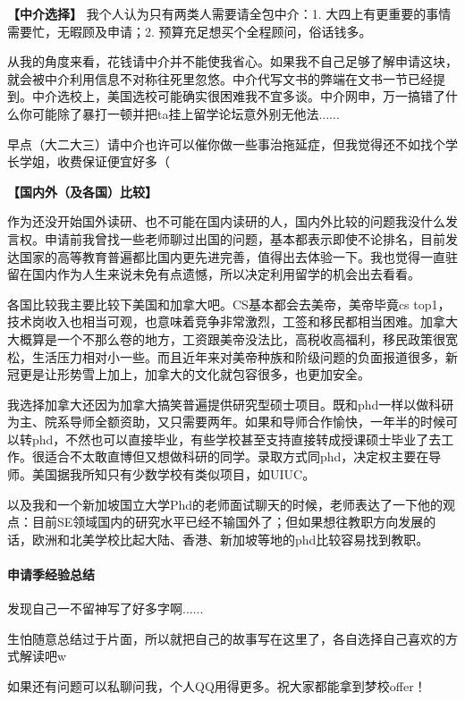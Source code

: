 {\bf 【中介选择】} 
我个人认为只有两类人需要请全包中介：1. 大四上有更重要的事情需要忙，无暇顾及申请；2. 预算充足想买个全程顾问，俗话钱多。

从我的角度来看，花钱请中介并不能使我省心。如果我不自己足够了解申请这块，就会被中介利用信息不对称往死里忽悠。中介代写文书的弊端在文书一节已经提到。中介选校上，美国选校可能确实很困难我不宜多谈。中介网申，万一搞错了什么你可能除了暴打一顿并把ta挂上留学论坛意外别无他法......

早点（大二大三）请中介也许可以催你做一些事治拖延症，但我觉得还不如找个学长学姐，收费保证便宜好多（

{\bf 【国内外（及各国）比较】} 

作为还没开始国外读研、也不可能在国内读研的人，国内外比较的问题我没什么发言权。申请前我曾找一些老师聊过出国的问题，基本都表示即使不论排名，目前发达国家的高等教育普遍都比国内更先进完善，值得出去体验一下。我也觉得一直驻留在国内作为人生来说未免有点遗憾，所以决定利用留学的机会出去看看。

各国比较我主要比较下美国和加拿大吧。CS基本都会去美帝，美帝毕竟cs top1，技术岗收入也相当可观，也意味着竞争非常激烈，工签和移民都相当困难。加拿大大概算是一个不那么卷的地方，工资跟美帝没法比，高税收高福利，移民政策很宽松，生活压力相对小一些。而且近年来对美帝种族和阶级问题的负面报道很多，新冠更是让形势雪上加上，加拿大的文化就包容很多，也更加安全。

我选择加拿大还因为加拿大搞笑普遍提供研究型硕士项目。既和phd一样以做科研为主、院系导师全额资助，又只需要两年。如果和导师合作愉快，一年半的时候可以转phd，不然也可以直接毕业，有些学校甚至支持直接转成授课硕士毕业了去工作。很适合不太敢直博但又想做科研的同学。录取方式同phd，决定权主要在导师。美国据我所知只有少数学校有类似项目，如UIUC。

以及我和一个新加坡国立大学Phd的老师面试聊天的时候，老师表达了一下他的观点：目前SE领域国内的研究水平已经不输国外了；但如果想往教职方向发展的话，欧洲和北美学校比起大陆、香港、新加坡等地的phd比较容易找到教职。



\paragraph{申请季经验总结}

发现自己一不留神写了好多字啊......

生怕随意总结过于片面，所以就把自己的故事写在这里了，各自选择自己喜欢的方式解读吧w

如果还有问题可以私聊问我，个人QQ用得更多。祝大家都能拿到梦校offer！

\newpage

